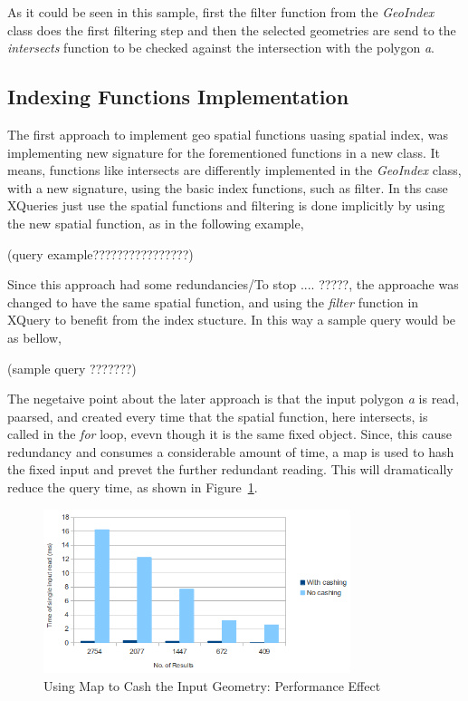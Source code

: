 \documentclass[a4paper,12pt]{article}
\begin{document}
As it could be seen in this sample, first the filter function from the \textit{GeoIndex} class does the first filtering step and then the selected geometries are send to the \textit{intersects} function to be checked against the intersection with the polygon \textit{a}.  

\subsection{Indexing Functions Implementation}
The first approach to implement geo spatial functions uasing spatial index, was implementing new signature for the forementioned functions in a new class. It means, functions like intersects are differently implemented in the \textit{GeoIndex} class, with a new signature, using the basic index functions, such as filter. In ths case XQueries just use the spatial functions and filtering is done implicitly by using the new spatial function, as in the following example,

(query example????????????????)

Since this approach had some redundancies/To stop ....  ?????, the approache was changed to have the same spatial function, and using the \textit{filter} function in XQuery to benefit from the index stucture. In this way a sample query would be as bellow,

 (sample query ???????)
 
The negetaive point about the later approach is that the input polygon \textit{a} is read, paarsed, and created every time that the spatial function, here intersects, is called in the \textit{for} loop, evevn though it is the same fixed object. Since, this cause redundancy and consumes a considerable amount of time, a map is used to hash the fixed input and prevet the further redundant reading. This will dramatically reduce the query time, as shown in Figure~\ref{figMap}.

 \begin{figure}
\centering
\includegraphics[width=0.8\textwidth]{MapIndexing}
\caption{Using Map to Cash the Input Geometry: Performance Effect}
\label{figMap}
\end{figure}
\end{document}
